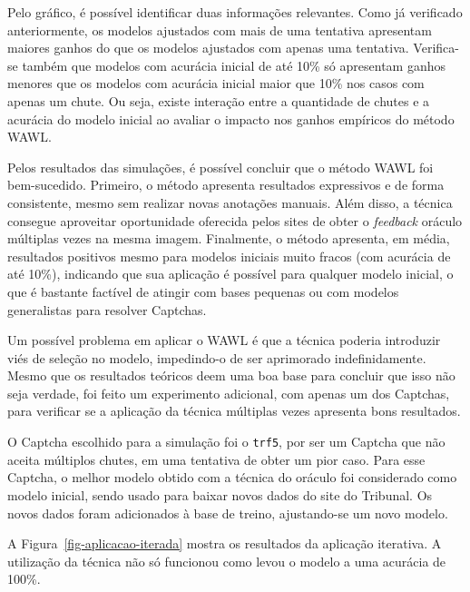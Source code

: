 \documentclass[12pt,twoside,brazilian]{book}
\begin{document}
Pelo gráfico, é possível identificar duas informações relevantes. Como
já verificado anteriormente, os modelos ajustados com mais de uma
tentativa apresentam maiores ganhos do que os modelos ajustados com
apenas uma tentativa. Verifica-se também que modelos com acurácia
inicial de até 10\% só apresentam ganhos menores que os modelos com
acurácia inicial maior que 10\% nos casos com apenas um chute. Ou seja,
existe interação entre a quantidade de chutes e a acurácia do modelo
inicial ao avaliar o impacto nos ganhos empíricos do método WAWL.

Pelos resultados das simulações, é possível concluir que o método WAWL
foi bem-sucedido. Primeiro, o método apresenta resultados expressivos e
de forma consistente, mesmo sem realizar novas anotações manuais. Além
disso, a técnica consegue aproveitar oportunidade oferecida pelos sites
de obter o \emph{feedback} oráculo múltiplas vezes na mesma imagem.
Finalmente, o método apresenta, em média, resultados positivos mesmo
para modelos iniciais muito fracos (com acurácia de até 10\%), indicando
que sua aplicação é possível para qualquer modelo inicial, o que é
bastante factível de atingir com bases pequenas ou com modelos
generalistas para resolver Captchas.

Um possível problema em aplicar o WAWL é que a técnica poderia
introduzir viés de seleção no modelo, impedindo-o de ser aprimorado
indefinidamente. Mesmo que os resultados teóricos deem uma boa base para
concluir que isso não seja verdade, foi feito um experimento adicional,
com apenas um dos Captchas, para verificar se a aplicação da técnica
múltiplas vezes apresenta bons resultados.

O Captcha escolhido para a simulação foi o \texttt{trf5}, por ser um
Captcha que não aceita múltiplos chutes, em uma tentativa de obter um
pior caso. Para esse Captcha, o melhor modelo obtido com a técnica do
oráculo foi considerado como modelo inicial, sendo usado para baixar
novos dados do site do Tribunal. Os novos dados foram adicionados à base
de treino, ajustando-se um novo modelo.

A Figura~\ref{fig-aplicacao-iterada} mostra os resultados da aplicação
iterativa. A utilização da técnica não só funcionou como levou o modelo
a uma acurácia de 100\%.
\end{document}

